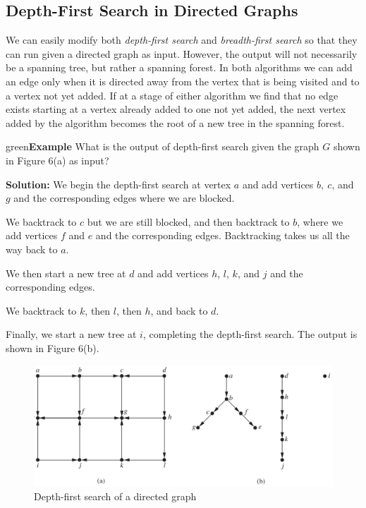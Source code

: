 \documentclass{article}
\newenvironment{example}{\begin{mybox}{green}{\textbf{Example}}}{\end{mybox}}
\begin{document}
\subsection{Depth-First Search in Directed Graphs}

We can easily modify both \textit{depth-first search} and \textit{breadth-first search} so that they can run given a directed graph as input. However, the output will not necessarily be a spanning tree, but rather a spanning forest. In both algorithms we can add an edge only when it is directed away from the vertex that is being visited and to a vertex not yet added. If at a stage of either algorithm we find that no edge exists starting at a vertex already added to one not yet added, the next vertex added by the algorithm becomes the root of a new tree in the spanning forest.

\begin{example}
What is the output of depth-first search given the graph $G$ shown in Figure 6(a) as input?

\textbf{Solution:}
We begin the depth-first search at vertex $a$ and add vertices $b,\ c$, and $g$ and the corresponding edges where we are blocked. 

We backtrack to $c$ but we are still blocked, and then backtrack to $b$, where we add vertices $f$ and $e$ and the corresponding edges. Backtracking takes
us all the way back to $a$. 

    We then start a new tree at $d$ and add vertices $h$, $l$, $k$, and $j$ and the corresponding edges. 

We backtrack to $k$, then $l$, then $h$, and back to $d$. 

Finally, we start a new tree at $i$, completing the depth-first search. The output is shown in Figure 6(b).
\end{example}

\begin{figure}[h!]
    \centering
    \includegraphics[width=\textwidth]{img/ch11.4-figure14.png}
    \caption{Depth-first search of a directed graph}
    \label{fig:my_label}
\end{figure}
\end{document}
